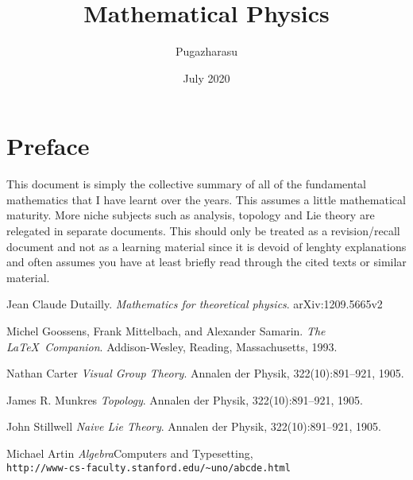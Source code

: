 \documentclass[a4paper,12pt]{book}
\begin{document}
\author{Pugazharasu}
\title{Mathematical Physics}
\date{July 2020}

\frontmatter
\maketitle
\pagebreak
\chapter*{Preface}
This document is simply the collective summary of all of the fundamental mathematics that I have learnt over the years. This assumes a little mathematical maturity. More niche subjects such as analysis, topology and Lie theory are relegated in separate documents. This should only be treated as a revision/recall document and not as a learning material since it is devoid of lenghty explanations and often assumes you have at least briefly read through the cited texts or similar material.
\nopagebreak
\tableofcontents




\mainmatter
%
%
%
%
%
%









\backmatter
\begin{thebibliography}{9}
	Jean Claude Dutailly.
	\textit{Mathematics for theoretical physics}.
	arXiv:1209.5665v2
	
	Michel Goossens, Frank Mittelbach, and Alexander Samarin. 
	\textit{The \LaTeX\ Companion}. 
	Addison-Wesley, Reading, Massachusetts, 1993.
	
	Nathan Carter 
	\textit{Visual Group Theory}. 
	Annalen der Physik, 322(10):891–921, 1905.
	
	James R. Munkres 
	\textit{Topology}.
	Annalen der Physik, 322(10):891–921, 1905.
	
	John Stillwell 
	\textit{Naive Lie Theory}. 
	Annalen der Physik, 322(10):891–921, 1905.
	
	Michael Artin 
	\textit{Algebra}Computers and Typesetting,
	\\\texttt{http://www-cs-faculty.stanford.edu/\~{}uno/abcde.html}
\end{thebibliography}
\end{document}

